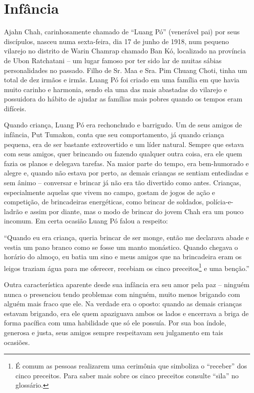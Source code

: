 \chapter{Infância}

Ajahn Chah, carinhosamente chamado de ``Luang Pó'' (venerável pai) por
seus discípulos, nasceu numa sexta-feira, dia 17 de junho de 1918, num
pequeno vilarejo no distrito de Warin Chamrap chamado Ban Kó, localizado
na província de Ubon Ratchatani -- um lugar famoso por ter sido lar de
muitas sábias personalidades no passado. Filho de Sr. Maa e Sra. Pim
Chuang Choti, tinha um total de dez irmãos e irmãs. Luang Pó foi criado
em uma família em que havia muito carinho e harmonia, sendo ela uma das
mais abastadas do vilarejo e possuidora do hábito de ajudar as famílias
mais pobres quando os tempos eram difíceis.

Quando criança, Luang Pó era rechonchudo e barrigudo. Um de seus amigos
de infância, Put Tumakon, conta que seu comportamento, já quando criança
pequena, era de ser bastante extrovertido e um líder natural. Sempre que
estava com seus amigos, quer brincando ou fazendo qualquer outra coisa,
era ele quem fazia os planos e delegava tarefas. Na maior parte do
tempo, era bem-humorado e alegre e, quando não estava por perto, as
demais crianças se sentiam entediadas e sem ânimo -- conversar e brincar
já não era tão divertido como antes. Crianças, especialmente aquelas que
vivem no campo, gostam de jogos de ação e competição, de brincadeiras
energéticas, como brincar de soldados, polícia-e-ladrão e assim por
diante, mas o modo de brincar do jovem Chah era um pouco incomum. Em
certa ocasião Luang Pó falou a respeito:

``Quando eu era criança, queria brincar de ser monge, então me declarava
abade e vestia um pano branco como se fosse um manto monástico. Quando
chegava o horário do almoço, eu batia um sino e meus amigos que na
brincadeira eram os leigos traziam água para me oferecer, recebiam os
cinco preceitos\footnote{É comum as pessoas realizarem uma cerimônia que
  simboliza o ``receber'' dos cinco preceitos. Para saber mais sobre os
  cinco preceitos consulte ``sīla'' no glossário.} e uma benção.''

Outra característica aparente desde sua infância era seu amor pela paz
-- ninguém nunca o presenciou tendo problemas com ninguém, muito menos
brigando com alguém mais fraco que ele. Na verdade era o oposto: quando
as demais crianças estavam brigando, era ele quem apaziguava ambos os
lados e encerrava a briga de forma pacífica com uma habilidade que só
ele possuía. Por sua boa índole, generosa e justa, seus amigos sempre
respeitavam seu julgamento em tais ocasiões.

